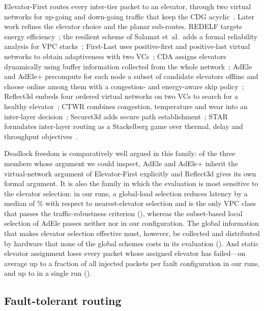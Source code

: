 Elevator-First routes every inter-tier packet to an elevator, through two virtual networks for up-going and down-going traffic that keep the CDG acyclic~\cite{dubois2013elevator}. Later work refines the elevator choice and the planar sub-routes. REDELF targets energy efficiency~\cite{lee2015redelf}; the resilient scheme of Salamat et~al.\ adds a formal reliability analysis for VPC stacks~\cite{salamat2016resilient}; First-Last uses positive-first and positive-last virtual networks to obtain adaptiveness with two VCs~\cite{charif2018firstlast}; CDA assigns elevators dynamically using buffer information collected from the whole network~\cite{fu2019cda}; AdEle and AdEle+ precompute for each node a subset of candidate elevators offline and choose online among them with a congestion- and energy-aware skip policy~\cite{taheri2021adele,taheri2023adeleplus}; Reflect3d embeds four ordered virtual networks on two VCs to search for a healthy elevator~\cite{silva2021reflect3d}; CTWR combines congestion, temperature and wear into an inter-layer decision~\cite{ctwr2025}; Securet3d adds secure path establishment~\cite{dasilva2025securet3d}; STAR formulates inter-layer routing as a Stackelberg game over thermal, delay and throughput objectives~\cite{ning2026star}.

Deadlock freedom is comparatively well argued in this family: of the three members whose argument we could inspect, AdEle and AdEle+ inherit the virtual-network argument of Elevator-First explicitly and Reflect3d gives its own formal argument. It is also the family in which the evaluation is most sensitive to the elevator selection: in our runs, a global-load selection reduces latency by a median of \% with respect to nearest-elevator selection and is the only VPC class that passes the traffic-robustness criterion (), whereas the subset-based local selection of AdEle passes neither  nor  in our configuration. The global information that makes elevator selection effective must, however, be collected and distributed by hardware that none of the global schemes costs in its evaluation (). And static elevator assignment loses every packet whose assigned elevator has failed---on average up to a fraction  of all injected packets per fault configuration in our runs, and up to  in a single run ().

\subsection{Fault-tolerant routing}
\label{sec:rev-fault}

